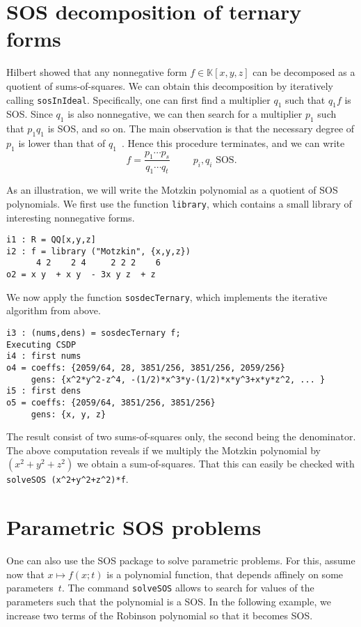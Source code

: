 \documentclass[11pt]{amsart}
\theoremstyle{plain}%
\theoremstyle{definition}
\theoremstyle{remark}
\newcommand{\SOS}{\textsc{SOS}\xspace}
\newcommand{\kk}{\mathbb{K}}
\begin{document}
\section{SOS decomposition of ternary forms}

Hilbert showed that any nonnegative form $f\in \kk[x,y,z]$ can be decomposed as a quotient of sums-of-squares.
We can obtain this decomposition by iteratively calling \verb|sosInIdeal|.
Specifically, one can first find a multiplier $q_{1}$ such that $q_{1}f$ is SOS.
Since $q_1$ is also nonnegative, we can then search for a multiplier $p_{1}$ such that $p_{1}q_{1}$ is SOS, and so on.
The main observation is that the necessary degree of $p_{1}$ is lower than that of $q_{1}$~\cite{de2004products}.
Hence this procedure terminates, and we can write
\[
  f = \frac{p_{1}\cdots p_{s}}{q_{1}\cdots q_{t}} \qquad \text {
    $p_{i},q_{i}$ SOS}.
\]

As an illustration, we will write the Motzkin polynomial as a quotient of SOS polynomials.
We first use the function \verb|library|, which contains a small library of interesting nonnegative forms.
{\small
\begin{verbatim}
i1 : R = QQ[x,y,z]
i2 : f = library ("Motzkin", {x,y,z})
      4 2    2 4     2 2 2    6
o2 = x y  + x y  - 3x y z  + z
\end{verbatim}
}

\noindent
We now apply the function \verb|sosdecTernary|, which implements the iterative algorithm from above.
{\small
\begin{verbatim}
i3 : (nums,dens) = sosdecTernary f;
Executing CSDP
i4 : first nums
o4 = coeffs: {2059/64, 28, 3851/256, 3851/256, 2059/256}
     gens: {x^2*y^2-z^4, -(1/2)*x^3*y-(1/2)*x*y^3+x*y*z^2, ... }
i5 : first dens
o5 = coeffs: {2059/64, 3851/256, 3851/256}
     gens: {x, y, z}
\end{verbatim}
}

The result consist of two sums-of-squares only, the second being the denominator.
The above computation reveals if we multiply the Motzkin polynomial by $(x^{2}+y^{2}+z^{2})$ we obtain a sum-of-squares.
That this can easily be checked with \verb|solveSOS (x^2+y^2+z^2)*f|.

\section{Parametric SOS problems}

One can also use the \SOS package to solve parametric problems.
For this, assume now that $x \mapsto f(x;t)$ is a polynomial function, that depends affinely on some parameters~$t$.
The command \verb|solveSOS| allows to search for values of the parameters such that the polynomial is a SOS.
In the following example, we increase two terms of the Robinson polynomial so that it becomes SOS.
\end{document}

